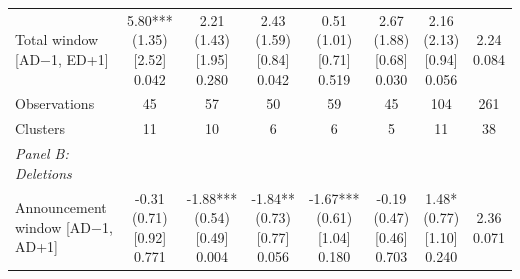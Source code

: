 \begin{threeparttable}
\begin{tabular}{@{}lccccccc}
\addlinespace[0.25ex]
\addlinespace[0.25ex]
Total window [AD$-$1, ED+1] & \makecell{5.80***\\(1.35)\\{}[2.52]\\{0.042}} & \makecell{2.21\\(1.43)\\{}[1.95]\\{0.280}} & \makecell{2.43\\(1.59)\\{}[0.84]\\{0.042}} & \makecell{0.51\\(1.01)\\{}[0.71]\\{0.519}} & \makecell{2.67\\(1.88)\\{}[0.68]\\{0.030}} & \makecell{2.16\\(2.13)\\{}[0.94]\\{0.056}} & \makecell{2.24\\{0.084}} \\
\addlinespace[0.25ex]
\addlinespace[0.25ex]
Observations & 45 & 57 & 50 & 59 & 45 & 104 & 261 \\
\addlinespace[0.25ex]
\addlinespace[0.25ex]
Clusters & 11 & 10 & 6 & 6 & 5 & 11 & 38 \\
\addlinespace[0.25ex]
\midrule
\emph{Panel B: Deletions} \\
\addlinespace[0.25ex]
\addlinespace[1ex]
Announcement window [AD$-$1, AD+1] & \makecell{-0.31\\(0.71)\\{}[0.92]\\{0.771}} & \makecell{-1.88***\\(0.54)\\{}[0.49]\\{0.004}} & \makecell{-1.84**\\(0.73)\\{}[0.77]\\{0.056}} & \makecell{-1.67***\\(0.61)\\{}[1.04]\\{0.180}} & \makecell{-0.19\\(0.47)\\{}[0.46]\\{0.703}} & \makecell{1.48*\\(0.77)\\{}[1.10]\\{0.240}} & \makecell{2.36\\{0.071}} \\

\end{tabular}
\end{threeparttable}
